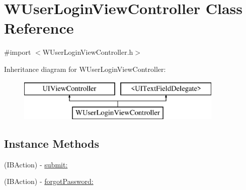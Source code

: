 \hypertarget{interface_w_user_login_view_controller}{\section{W\-User\-Login\-View\-Controller Class Reference}
\label{interface_w_user_login_view_controller}
}


{\ttfamily \#import $<$W\-User\-Login\-View\-Controller.\-h$>$}

Inheritance diagram for W\-User\-Login\-View\-Controller\-:\begin{figure}[H]
\begin{center}
\leavevmode
\includegraphics[height=2.000000cm]{interface_w_user_login_view_controller}
\end{center}
\end{figure}
\subsection*{Instance Methods}
\begin{DoxyCompactItemize}
\item 
(I\-B\-Action) -\/ \hyperlink{interface_w_user_login_view_controller_a59719dbcd701d0088018c62051de798a}{submit\-:}
\item 
(I\-B\-Action) -\/ \hyperlink{interface_w_user_login_view_controller_a790c09d15a74011f2ad33e3f266d0545}{forgot\-Password\-:}
\end{DoxyCompactItemize}
